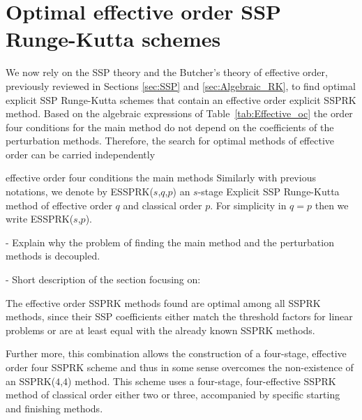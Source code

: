 \section{Optimal effective order SSP Runge-Kutta schemes}\label{sec:Optimal_ESSPRK}

We now rely on the SSP theory and the Butcher's theory of effective order, previously reviewed in Sections \ref{sec:SSP} and \ref{sec:Algebraic_RK}, to find optimal explicit SSP Runge-Kutta schemes that contain an effective order explicit SSPRK method. Based on the algebraic expressions of Table~\ref{tab:Effective_oc} the order four conditions for the main method do not depend on the coefficients of the perturbation methods. Therefore, the search for optimal methods of effective order can be carried independently 


effective order four conditions the main methods Similarly with previous notations, we denote by ESSPRK($s$,$q$,$p$) an $s$-stage Explicit SSP Runge-Kutta method of effective order $q$ and classical order $p$. For simplicity in $q=p$ then we write ESSPRK($s$,$p$). 

- Explain why the problem of finding the main method and the perturbation methods is decoupled.

- Short description of the section focusing on: 







The effective order SSPRK methods found are optimal among all SSPRK methods, since their SSP coefficients either match the threshold factors for linear problems  or are at least equal with the already known SSPRK methods. 


Further more, this combination allows the construction of a
four-stage, effective order four SSPRK scheme and thus in some sense overcomes the
non-existence of an SSPRK(\( 4 \),\( 4 \)) method.  This scheme uses a
four-stage, four-effective SSPRK method of classical order either two
or three, accompanied by specific starting and finishing methods.


